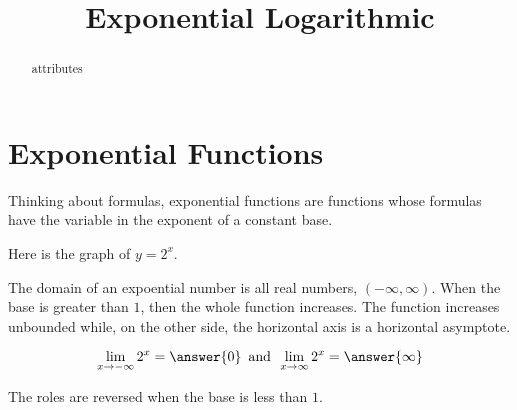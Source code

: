 \documentclass{ximera}
\title{Exponential Logarithmic}
\begin{document}
\begin{abstract}
attributes
\end{abstract}
\maketitle


\section{Exponential Functions}

Thinking about formulas, exponential functions are functions whose formulas have the variable in the exponent of a constant base.






Here is the graph of $y = 2^x$.

\begin{image}
\end{image}


The domain of an expoential number is all real numbers, $(-\infty, \infty)$.  When the base is greater than $1$, then the whole function increases.  The function increases unbounded while, on the other side, the horizontal axis is a horizontal asymptote.

\[  \lim_{x \to -\infty} 2^x = \answer{0}     \, \text{ and } \,  \lim_{x \to \infty} 2^x = \answer{\infty}   \]



The roles are reversed when the base is less than $1$.
\end{document}
